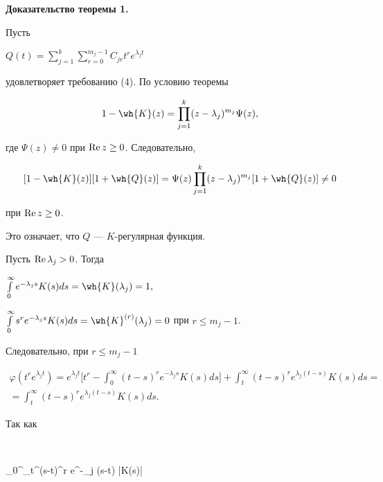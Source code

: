 {\bf Доказательство теоремы 1.}


Пусть


$Q(t)= \sum \limits_{j=1}^k


\sum \limits_{r=0}^{m_j-1}C_{jr}t^r e^{\lambda_j t} $


удовлетворяет требованию (4). По условию теоремы


$$


1-\wh{K}(z)= \prod \limits_{j=1}^k (z-


\lambda_j)^{m_j} \Psi (z),


$$


где $\Psi (z) \neq 0$ при $\operatorname{Re} z \geq 0$. Следовательно,


$$


[1- \wh{K}(z)][1+ \wh{Q}(z)]= \Psi (z) \prod \limits_{j=1}^k (z-


\lambda_j)^{m_j} [1+ \wh{Q}(z)] \neq 0


$$


при $\operatorname{Re} z \geq 0$.


Это означает, что $Q$ --- $K$-регулярная функция.





Пусть $\operatorname{Re} \lambda_j >0$. Тогда


$\int \limits_0^\infty e^{-\lambda_j s} K(s) ds=


\wh{K}(\lambda_j)=1,$


$\int \limits_0^\infty s^r e^{-\lambda_j s} K(s) ds=\wh{K}


^{(r)}(\lambda_j)=0$ при $r \leq m_j-1$.


Следовательно, при $r \leq m_j-1$


\begin{multline*}


\varphi(t^r e^{\lambda_j t})=


e^{\lambda_j t}\bigg[t^r-\int_0^\infty (t-s)^r e^


{-\lambda_j s} K(s) ds \bigg]+


\int_t^\infty (t-s)^r e^{\lambda_j


(t-s)} K(s) ds =\\


=\int_t^\infty (t-s)^r e^{\lambda_j (t-s)} K(s) ds.


\end{multline*}


Так как


$$


\int_0^\infty \int_t^\infty (s-t)^r e^{-\re \lambda_j (s-t)} |K(s)|


